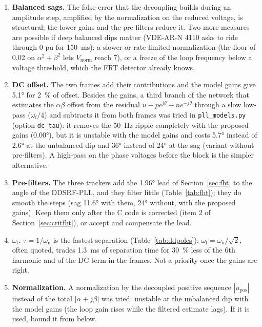 \documentclass[11pt,a4paper]{scrartcl}
\newcommand{\ped}[1]{_{\mathrm{#1}}}
\newcommand{\code}[1]{\texttt{#1}}
\begin{document}
\begin{onehalfspace}
\begin{enumerate}
	\item \textbf{Balanced sags.} The false error that the decoupling builds during an amplitude step, amplified by the normalization on the reduced voltage, is structural; the lower gains and the pre-filters reduce it. Two more measures are possible if deep balanced dips matter (VDE-AR-N 4110 asks to ride through \num{0} pu for \SI{150}{\milli\second}): a slower or rate-limited normalization (the floor of \num{0.02} on $\alpha^2+\beta^2$ lets $V\ped{norm}$ reach \num{7}), or a freeze of the loop frequency below a voltage threshold, which the FRT detector already knows.
	\item \textbf{DC offset.} The two frames add their contributions and the model gains give \ang{5.1} for \num{2}~\% of offset. Besides the gains, a third branch of the network that estimates the $\alpha\beta$ offset from the residual $u - p e^{j\theta} - n e^{-j\theta}$ through a slow low-pass ($\omega\ped{f}/4$) and subtracts it from both frames was tried in \code{pll\_models.py} (option \code{dc\_tau}): it removes the \SI{50}{\hertz} ripple completely with the proposed gains (\ang{0.00}), but it is unstable with the model gains and costs \ang{5.7} instead of \ang{2.6} at the unbalanced dip and \ang{36} instead of \ang{24} at the sag (variant without pre-filters). A high-pass on the phase voltages before the block is the simpler alternative.
	\item \textbf{Pre-filters.} The three trackers add the \ang{1.96} lead of Section~\ref{sec:fht} to the angle of the DDSRF-PLL, and they filter little (Table~\ref{tab:fht}); they do smooth the steps (sag \ang{11.6} with them, \ang{24} without, with the proposed gains). Keep them only after the C code is corrected (item 2 of Section~\ref{sec:critfht}), or accept and compensate the lead.
	\item \textbf{$\omega\ped{f}$.} $\tau = 1/\omega\ped{n}$ is the fastest separation (Table~\ref{tab:ddpoles}); $\omega\ped{f} = \omega\ped{n}/\sqrt2$, often quoted, trades \SI{1.3}{\milli\second} of separation time for \num{30}~\% less of the 6th harmonic and of the DC term in the frames. Not a priority once the gains are right.
	\item \textbf{Normalization.} A normalization by the decoupled positive sequence $|u\ped{pos}|$ instead of the total $|\alpha + j\beta|$ was tried: unstable at the unbalanced dip with the model gains (the loop gain rises while the filtered estimate lags). If it is used, bound it from below.
\end{enumerate}


\end{onehalfspace}
\end{document}
